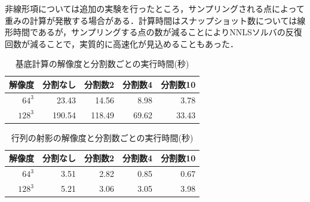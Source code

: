 \documentclass[uplatex,dvipdfmx,10pt,a4paper,notitlepage,oneside,twocolumn]{abst_jsarticle}
\begin{document}
非線形項については追加の実験を行ったところ，サンプリングされる点によって重みの計算が発散する場合がある．計算時間はスナップショット数については線形時間であるが，サンプリングする点の数が減ることによりNNLSソルバの反復回数が減ることで，実質的に高速化が見込めることもあった．

\begin {table}[htbp]
    \centering
  \caption{基底計算の解像度と分割数ごとの実行時間(秒)}
  \label{tab:basis}
  \begin {tabular}{rrrrr} \hline
    \multicolumn{1}{c}{解像度} 					&\multicolumn{1}{c}{分割なし} 		&\multicolumn{1}{c}{分割数2}			&\multicolumn{1}{c}{分割数4} 		&\multicolumn{1}{c}{分割数10}\\ \hline
    $64^3$ 					& 23.43 			&14.56	 		&8.98	 	&3.78\\
    $128^3$ 				& 190.54 			&118.49 			& 69.62 		&33.43\\ \hline
  \end {tabular}
\end {table}

\begin {table}[htbp]
    \centering
  \caption{行列の射影の解像度と分割数ごとの実行時間(秒)}
  \label{tab:projection}
  \begin {tabular}{rrrrr} \hline
    \multicolumn{1}{c}{解像度} 					&\multicolumn{1}{c}{分割なし} 		&\multicolumn{1}{c}{分割数2}			&\multicolumn{1}{c}{分割数4} 		&\multicolumn{1}{c}{分割数10}\\ \hline
    $64^3$ 					& 3.51 			&2.82	 		&0.85	 		&0.67\\
    $128^3$ 				& 5.21 			& 3.06 			& 3.05 			&3.98\\ \hline
  \end {tabular}
\end {table}
\end{document}
